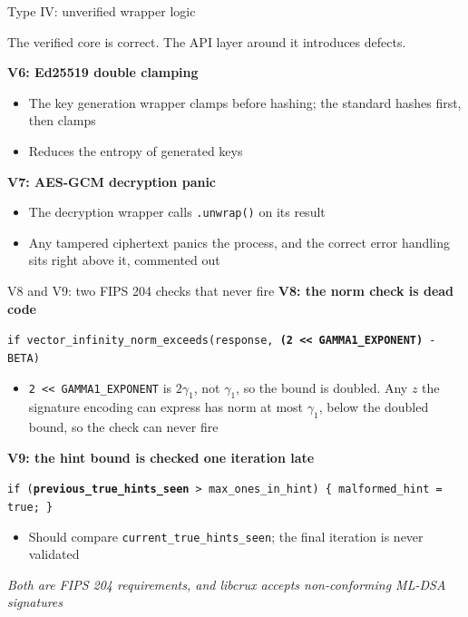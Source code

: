 \ifdefined\PRESENTATION\else\PassOptionsToClass{handout}{beamer}\fi\documentclass[aspectratio=169, lualatex]{beamer}
\begin{document}
\begin{frame}{Type IV: unverified wrapper logic}
	\begin{center}
		\Large
		The verified core is correct. The API layer around it introduces defects.
	\end{center}
	\vspace{1em}
	\textbf{V6: Ed25519 double clamping}
	\begin{itemize}
		\item The key generation wrapper clamps before hashing; the standard hashes first, then clamps
		\item Reduces the entropy of generated keys
	\end{itemize}
	\vspace{0.5em}
	\textbf{V7: AES-GCM decryption panic}
	\begin{itemize}
		\item The decryption wrapper calls \texttt{.unwrap()} on its result
		\item Any tampered ciphertext panics the process, and the correct error handling sits right above it, commented out
	\end{itemize}
\end{frame}

\begin{frame}{V8 and V9: two FIPS 204 checks that never fire}
	\small
	\textbf{V8: the norm check is dead code}
	\begin{flushleft}
		\texttt{if vector\_infinity\_norm\_exceeds(response, \textbf{(2 << GAMMA1\_EXPONENT)} - BETA)}
	\end{flushleft}
	\begin{itemize}
		\item \texttt{2 << GAMMA1\_EXPONENT} is $2\gamma_1$, not $\gamma_1$, so the bound is doubled. Any $z$ the signature encoding can express has norm at most $\gamma_1$, below the doubled bound, so the check can never fire
	\end{itemize}
	\vspace{0.4em}
	\textbf{V9: the hint bound is checked one iteration late}
	\begin{flushleft}
		\texttt{if (\textbf{previous\_true\_hints\_seen} > max\_ones\_in\_hint) \{ malformed\_hint = true; \}}
	\end{flushleft}
	\begin{itemize}
		\item Should compare \texttt{current\_true\_hints\_seen}; the final iteration is never validated
	\end{itemize}
	\vspace{0.4em}
	\begin{center}
		\textit{Both are FIPS 204 requirements, and libcrux accepts non-conforming ML-DSA signatures}
	\end{center}
\end{frame}
\end{document}
